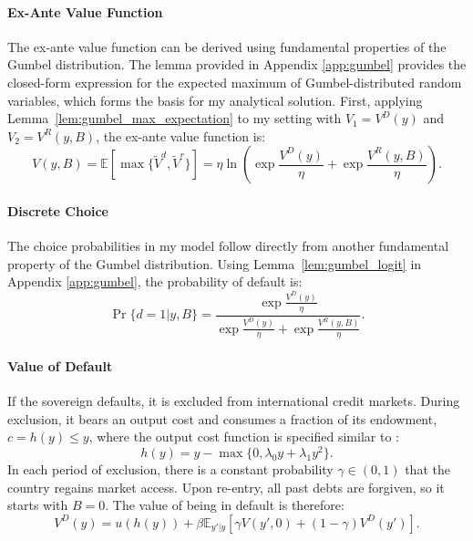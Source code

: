 \documentclass[12pt]{article}
\theoremstyle{plain}
\begin{document}
\paragraph{Ex-Ante Value Function}
The ex-ante value function can be derived using fundamental properties of the
Gumbel distribution. The lemma provided in Appendix \ref{app:gumbel} provides
the closed-form expression for the expected maximum of Gumbel-distributed
random variables, which forms the basis for my analytical solution. First,
applying Lemma~\ref{lem:gumbel_max_expectation} to my setting with $V_1 =
	V^D(y)$ and $V_2 = V^R(y, B)$, the ex-ante value function is:
\begin{equation}\label{eq:V_choice}
	V(y, B) = \mathbb{E}\left[\max\{\tilde{V}^d, \tilde{V}^r\}\right] = \eta \ln\left( \exp\frac{V^D(y)}{\eta} + \exp\frac{V^R(y, B)}{\eta} \right).
\end{equation}

\paragraph{Discrete Choice}
The choice probabilities in my model follow directly from another fundamental
property of the Gumbel distribution. Using Lemma~\ref{lem:gumbel_logit} in
Appendix \ref{app:gumbel}, the probability of default is:
\begin{equation}\label{eq:prd_1}
	\Pr\{d=1 | y, B\} = \frac{\exp\frac{V^D(y)}{\eta}}{\exp\frac{V^D(y)}{\eta} + \exp\frac{V^R(y, B)}{\eta}}.
\end{equation}

\paragraph{Value of Default}
If the sovereign defaults, it is excluded from international credit markets.
During exclusion, it bears an output cost and consumes a fraction of its
endowment, $c = h(y) \le y$, where the output cost function is specified
similar to \citep{ChatterjeeEyigungor2012}:
\begin{equation}
	h(y) = y - \max\{0, \lambda_0 y + \lambda_1 y^2\}.
\end{equation}
In each period of exclusion, there is a constant probability $\gamma \in (0, 1)$ that the country regains market access. Upon re-entry, all past debts are forgiven, so it starts with $B=0$. The value of being in default is therefore:
\begin{equation}
	V^D(y) = u(h(y)) + \beta \mathbb{E}_{y'|y} \left[ \gamma V(y', 0) + (1-\gamma) V^D(y') \right].
	\label{eq:Vd}
\end{equation}
\end{document}
